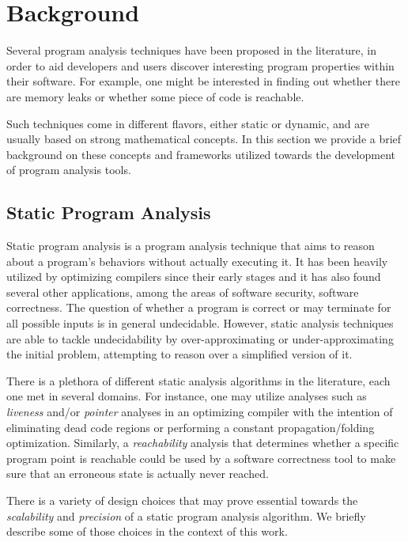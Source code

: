 \chapter{Background}\label{c:background}

Several program analysis techniques have been proposed in the literature, in
order to aid developers and users discover interesting program properties within
their software. For example, one might be interested in finding out whether
there are memory leaks or whether some piece of code is reachable.

Such techniques come in different flavors, either static or dynamic, and are
usually based on strong mathematical concepts. In this section we provide
a brief background on these concepts and frameworks utilized towards
the development of program analysis tools.

\section{Static Program Analysis}

Static program analysis is a program analysis technique that aims to reason
about a program's behaviors without actually executing it. It has been
heavily utilized by optimizing compilers since their early stages and it
has also found several other applications, among the areas of software security,
software correctness\cite{spa}. The question of whether
a program is correct or may terminate for all possible inputs is in general
undecidable. However, static analysis techniques are able to tackle
undecidability by over-approximating or under-approximating the initial problem,
attempting to reason over a simplified version of it.

There is a plethora of different static analysis algorithms in the literature, each one
met in several domains. For instance, one may utilize analyses such as \emph{liveness} and/or
\emph{pointer} analyses in an optimizing compiler with the intention of eliminating
dead code regions or performing a constant propagation/folding optimization.
Similarly, a \emph{reachability} analysis that determines whether a specific program point is
reachable could be used by a software correctness tool to make sure that
an erroneous state is actually never reached.

There is a variety of design choices that may prove essential towards the \emph{scalability}
and \emph{precision} of a static program analysis algorithm. We briefly describe some of
those choices in the context of this work.

